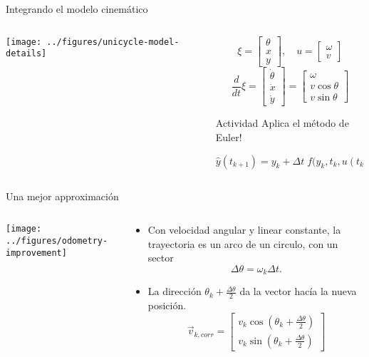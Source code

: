 \documentclass[presentation,aspectratio=169]{beamer}
\begin{document}
\begin{frame}[label={sec:orgecf02f4}]{Integrando el modelo cinemático}
\small

\begin{columns}
\begin{column}{0.4\columnwidth}
\begin{center}
 \texttt{[image: ../figures/unicycle-model-details]}
\end{center}
\end{column}

\begin{column}{0.6\columnwidth}
\[ \xi = \begin{bmatrix} \theta\\x\\y \end{bmatrix},   \quad u = \begin{bmatrix} \omega\\v \end{bmatrix}\]
\[\frac{d}{dt} \xi = \begin{bmatrix} \dot{\theta}\\\dot{x}\\\dot{y} \end{bmatrix} = \begin{bmatrix} \omega\\ v\cos\theta\\v\sin\theta\end{bmatrix} \]

\pause

\alert{Actividad} Aplica el método de Euler!

\[\hat{y}(t_{k+1}) = y_k + \Delta t \; f\big(y_k, t_k, u(t_k)\big). \]
\end{column}
\end{columns}
\end{frame}


\begin{frame}[label={sec:orgd12ceab}]{Una mejor approximación}
\begin{columns}
\begin{column}{0.6\columnwidth}
\begin{center}
  \texttt{[image: ../figures/odometry-improvement]}
\end{center}
\end{column}

\begin{column}{0.4\columnwidth}
\begin{itemize}
\item Con velocidad angular y linear constante, la trayectoria es un arco de un circulo, con un sector \[\Delta \theta = \omega_k \Delta t.\]
\item La dirección \(\theta_k + \frac{\Delta \theta}{2}\) da la vector hacía la nueva posición.
\[\vec{v}_{k, corr} = \begin{bmatrix} v_k \cos(\theta_k + \frac{\Delta \theta}{2})\\v_k\sin(\theta_k + \frac{\Delta \theta}{2})\end{bmatrix}\]
\end{itemize}
\end{column}
\end{columns}
\end{frame}
\end{document}
